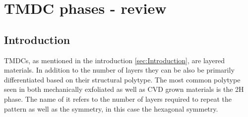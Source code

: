 \chapter{TMDC phases - review}

\section{Introduction}

TMDCs, as mentioned in the introduction \ref{sec:Introduction}, are layered materials. In addition to the number of layers they can be also be primarily differentiated based on their structural polytype. The most common polytype seen in both mechanically exfoliated as well as CVD grown materials is the 2H phase. The name of it refers to the number of layers required to repeat the pattern as well as the symmetry, in this case the hexagonal symmetry. 

